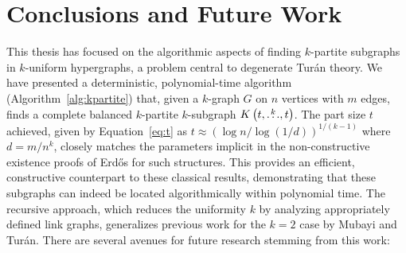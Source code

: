 \section{Conclusions and Future Work}\label{sec:conclusions} %

This thesis has focused on the algorithmic aspects of finding $k$-partite subgraphs in $k$-uniform hypergraphs,
a problem central to degenerate Turán theory.
We have presented a deterministic,
polynomial-time algorithm (Algorithm~\ref{alg:kpartite}) that, given a $k$-graph $G$ on $n$ vertices with $m$ edges,
finds a complete balanced $k$-partite $k$-subgraph $K\left(t, \overset{k}{\dots}, t\right)$.
The part size $t$ achieved, given by Equation~\eqref{eq:t} as $t \approx (\log n / \log(1/d))^{1/(k-1)}$ where $d=m/n^k$,
closely matches the parameters implicit in the non-constructive existence proofs of Erd\H{o}s for such structures.
This provides an efficient, constructive counterpart to these classical results,
demonstrating that these subgraphs can indeed be located algorithmically within polynomial time.
The recursive approach, which reduces the uniformity $k$ by analyzing appropriately defined link graphs,
generalizes previous work for the $k=2$
case by Mubayi and Turán.
There are several avenues for future research stemming from this work:

